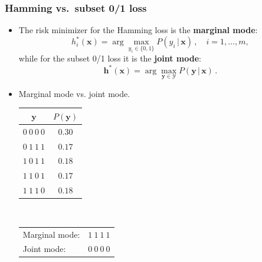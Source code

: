 \documentclass[]{beamer}
\renewcommand{\Pr}{P}
\renewcommand{\vec}[1]{\boldsymbol{#1}}
\newcommand{\given}{\, | \,}
\newcommand{\by}{\boldsymbol{y}}
\renewcommand{\emph}[1]{\textbf{\color{putblue}#1}}
\begin{document}
\begin{frame}
\frametitle{Hamming vs.\ subset 0/1 loss}
\begin{itemize}
\item The risk minimizer for the Hamming loss is the  \emph{marginal mode}:
$$
h_i^*(\vec{x}) = \arg \max_{y_i \in \{0,1\}} \Pr( y_i  \given \vec{x} )\,, \quad i = 1,\ldots,m ,
$$
while for the subset 0/1 loss it is the \emph{joint mode}:
$$
\mathbf{h}^*(\vec{x}) = \arg \max_{\vec{y} \in \mathcal{Y}} \Pr(\vec{y} \given \vec{x}) \,.
$$
\item Marginal mode vs. joint mode.\\[6pt]
\begin{center}
\begin{tabular}{@{}cc@{}}
\toprule
$\by$ & $\Pr(\by)$ \\
\hline
$0~0~0~0$ & $0.30$ \\
$0~1~1~1$ & $0.17$ \\
$1~0~1~1$ & $0.18$ \\
$1~1~0~1$ & $0.17$ \\
$1~1~1~0$ & $0.18$ \\
\toprule
\end{tabular}
$\qquad$
\footnotesize{
\begin{tabular}{lr}
Marginal mode: & $1~1~1~1$ \\
Joint mode: & $0~0~0~0$ \\
\end{tabular}
}
\end{center}
\end{itemize}
\end{frame}
\end{document}
